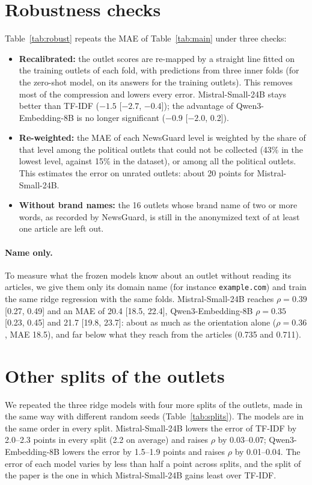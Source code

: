 \documentclass[11pt,a4paper]{article}
\begin{document}
\section{Robustness checks}\label{app:robust}
Table~\ref{tab:robust} repeats the MAE of Table~\ref{tab:main} under three checks:
\begin{itemize}
  \item \textbf{Recalibrated:} the outlet scores are re-mapped by a straight line fitted on the training outlets of each
        fold, with predictions from three inner folds (for the zero-shot model, on its answers for the training
        outlets). This removes most of the compression and lowers every error. Mistral-Small-24B stays better than
        TF-IDF ($-1.5$ [$-2.7$, $-0.4$]); the advantage of Qwen3-Embedding-8B is no longer significant ($-0.9$ [$-2.0$,
        0.2]).
  \item \textbf{Re-weighted:} the MAE of each NewsGuard level is weighted by the share of that level among the
        political outlets that could not be collected (43\% in the lowest level, against 15\% in the dataset), or among
        all the political outlets. This estimates the error on unrated outlets: about 20 points for Mistral-Small-24B.
  \item \textbf{Without brand names:} the 16 outlets whose brand name of two or more words, as recorded by NewsGuard, is
        still in the anonymized text of at least one article are left out.
\end{itemize}

\paragraph{Name only.} To measure what the frozen models know about an outlet without reading its articles, we give them
only its domain name (for instance \texttt{example.com}) and train the same ridge regression with the same folds.
Mistral-Small-24B reaches $\rho = 0.39$ [0.27, 0.49] and an MAE of 20.4 [18.5, 22.4], Qwen3-Embedding-8B $\rho = 0.35$
[0.23, 0.45] and 21.7 [19.8, 23.7]: about as much as the orientation alone ($\rho = 0.36$, MAE 18.5), and far below what
they reach from the articles (0.735 and 0.711).


\section{Other splits of the outlets}\label{app:splits}
We repeated the three ridge models with four more splits of the outlets, made in the same way with different random
seeds (Table~\ref{tab:splits}). The models are in the same order in every split. Mistral-Small-24B lowers the error of
TF-IDF by 2.0--2.3 points in every split (2.2 on average) and raises $\rho$ by 0.03--0.07; Qwen3-Embedding-8B lowers the
error by 1.5--1.9 points and raises $\rho$ by 0.01--0.04. The error of each model varies by less than half a point
across splits, and the split of the paper is the one in which Mistral-Small-24B gains least over TF-IDF.
\end{document}
